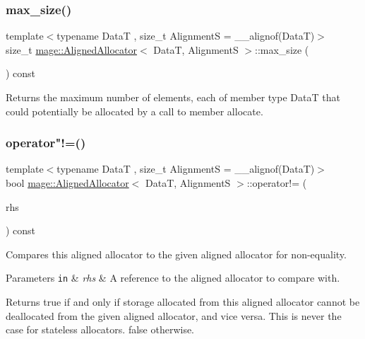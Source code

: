 \subsubsection{\texorpdfstring{max\+\_\+size()}{max\_size()}}
{\footnotesize\ttfamily template$<$typename DataT , size\+\_\+t AlignmentS = \+\_\+\+\_\+alignof(\+Data\+T)$>$ \\
size\+\_\+t \hyperlink{structmage_1_1_aligned_allocator}{mage\+::\+Aligned\+Allocator}$<$ DataT, AlignmentS $>$\+::max\+\_\+size (\begin{DoxyParamCaption}{ }\end{DoxyParamCaption}) const\hspace{0.3cm}{\ttfamily [noexcept]}}

Returns the maximum number of elements, each of member type {\ttfamily DataT} that could potentially be allocated by a call to member allocate. \hypertarget{structmage_1_1_aligned_allocator_aefd13c00b97c39f360051998f3005a49}{}\label{structmage_1_1_aligned_allocator_aefd13c00b97c39f360051998f3005a49} 
\subsubsection{\texorpdfstring{operator"!=()}{operator!=()}}
{\footnotesize\ttfamily template$<$typename DataT , size\+\_\+t AlignmentS = \+\_\+\+\_\+alignof(\+Data\+T)$>$ \\
bool \hyperlink{structmage_1_1_aligned_allocator}{mage\+::\+Aligned\+Allocator}$<$ DataT, AlignmentS $>$\+::operator!= (\begin{DoxyParamCaption}\item[{const \hyperlink{structmage_1_1_aligned_allocator}{Aligned\+Allocator}$<$ DataT, AlignmentS $>$ \&}]{rhs }\end{DoxyParamCaption}) const\hspace{0.3cm}{\ttfamily [noexcept]}}

Compares this aligned allocator to the given aligned allocator for non-\/equality.


\begin{DoxyParams}[1]{Parameters}
\mbox{\tt in}  & {\em rhs} & A reference to the aligned allocator to compare with. \\
\hline
\end{DoxyParams}
\begin{DoxyReturn}{Returns}
{\ttfamily true} if and only if storage allocated from this aligned allocator cannot be deallocated from the given aligned allocator, and vice versa. This is never the case for stateless allocators. {\ttfamily false} otherwise. 
\end{DoxyReturn}
\hypertarget{structmage_1_1_aligned_allocator_a4620c8e53ecc7294ff90d07e956810ed}{}\label{structmage_1_1_aligned_allocator_a4620c8e53ecc7294ff90d07e956810ed} 
